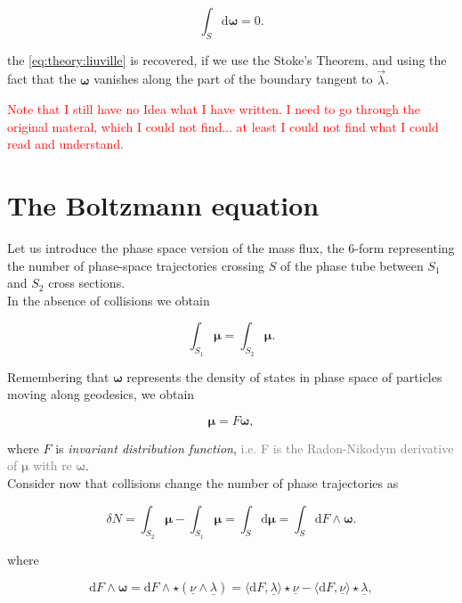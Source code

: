 \begin{equation}
\int_S\text{d}\boldsymbol{\omega} = 0.
\end{equation}

the \ref{eq:theory:liuville} is recovered, if we use the Stoke’s Theorem, and using the fact that the $\boldsymbol{\omega}$ vanishes along the part of the boundary tangent to $\vec{\lambda}$.

\textcolor{red}{Note that I still have no Idea what I have written. I need to go through the original materal, which I could not find... at least I could not find what I could read and understand. }


\section{The Boltzmann equation}


Let us introduce the phase space version of the mass flux, the 6-form representing the number of phase-space trajectories crossing $S$ of the phase tube between $S_1$ and $S_2$ cross sections. \\
In the absence of collisions we obtain 

\begin{equation}
\int_{S_1}\boldsymbol{\mu} = \int_{S_2}\boldsymbol{\mu}.
\end{equation}

Remembering that $\boldsymbol{\omega}$ represents the density of states in phase space of particles moving along geodesics, we obtain 

\begin{equation}
\boldsymbol{\mu} = F\boldsymbol{\omega},
\end{equation}

where $F$ is \textit{invariant distribution function}, \textcolor{gray}{i.e. F is the Radon-Nikodym derivative of $\boldsymbol{\mu}$ with re $\boldsymbol{\omega}$}. \\

Consider now that collisions change the number of phase trajectories as 

\begin{equation}
\delta N = \int_{S_2} \boldsymbol{\mu} - \int_{S_1}\boldsymbol{\mu} = \int_S \text{d}\boldsymbol{\mu} = \int_S \text{d}F\wedge\boldsymbol{\omega}.
\end{equation}

where 

\begin{equation}
\text{d}F\wedge\boldsymbol{\omega} = \text{d}F\wedge\star (\underline{\nu}\wedge\underline{\lambda}) = \langle\text{d}F,\underline{\lambda}\rangle\star\underline{\nu} - \langle\text{d}F,\underline{\nu}\rangle\star\underline{\lambda},
\end{equation}

